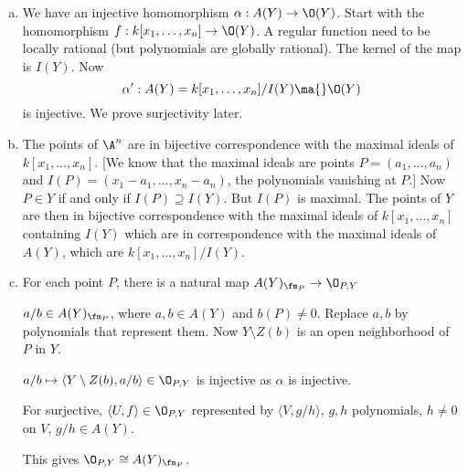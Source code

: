 \pf \hfill
\begin{enumerate}[(a)]
\item We have an injective homomorphism $\alpha: A(Y) \to \O(Y)$. Start with the homomorphism $f: k[x_1,\ldots,x_n] \to \O(Y)$. A regular function need to be locally rational (but polynomials are globally rational). The kernel of the map is $I(Y)$. Now
	\[
	\alpha': A(Y)= k[x_1,\ldots,x_n]/I(Y) \ma{} \O(Y)
	\]
is injective. We prove surjectivity later. 


\item The points of $\A^n$ are in bijective correspondence with the maximal ideals of $k[x_1,\ldots,x_n]$. [We know that the maximal ideals are points $P=(a_1,\ldots,a_n)$ and $I(P)= (x_1-a_1,\ldots,x_n-a_n)$, the polynomials vanishing at $P$.] Now $P \in Y$ if and only if $I(P) \supseteq I(Y)$. But $I(P)$ is maximal. The points of $Y$ are then in bijective correspondence with the maximal ideals of $k[x_1,\ldots,x_n]$ containing $I(Y)$ which are in correspondence with the maximal ideals of $A(Y)$, which are $k[x_1,\ldots,x_n]/I(Y)$. 

\item For each point $P$, there is a natural map $A(Y)_{\fm_P} \to \O_{P,Y}$

$a/b \in A(Y)_{\fm_P}$, where $a,b \in A(Y)$ and $b(P) \neq 0$. Replace $a,b$ by polynomials that represent them. Now $Y \setminus Z(b)$ is an open neighborhood of $P$ in $Y$.

$a/b \mapsto \langle Y \setminus Z(b), a/b \rangle \in \O_{P,Y}$ is injective as $\alpha$ is injective.

For surjective, $\langle U,f \rangle \in \O_{P,Y}$
represented by $\langle V, g/h \rangle$, $g,h$ polynomials, $h \neq 0$ on $V$, $g/h \in A(Y)$. 

This gives $\O_{P,Y} \cong A(Y)_{\fm_P}$. 
\end{enumerate}












































